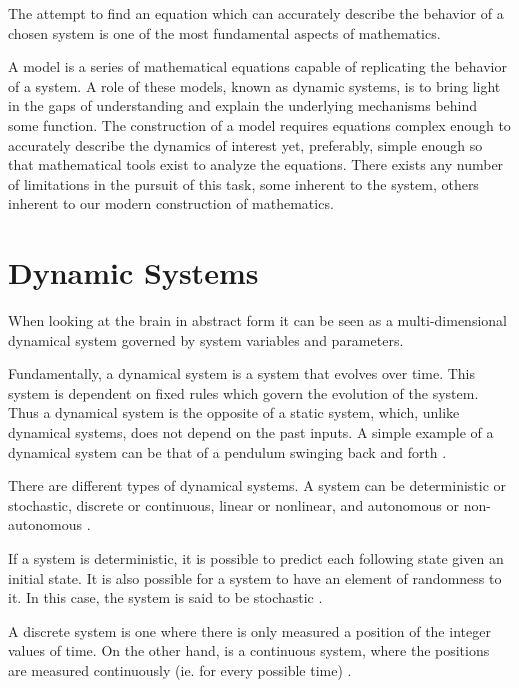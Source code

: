 \documentclass[../../Orator.tex]{subfiles}
\begin{document}
The attempt to find an equation which can accurately describe the behavior of a chosen system is one of the most fundamental aspects of mathematics.

A model is a series of mathematical equations capable of replicating the behavior of a system. A role of these models, known as dynamic systems, is to bring light in the gaps of understanding and explain the underlying mechanisms behind some function. 
The construction of a model requires equations complex enough to accurately describe the dynamics of interest yet, preferably, simple enough so that mathematical tools exist to analyze the equations\footnotemark. 
There exists any number of limitations in the pursuit of this task, some inherent to the system, others inherent to our modern construction of mathematics.

\section{Dynamic Systems}

When looking at the brain in abstract form it can be seen as a multi-dimensional dynamical system governed by system variables and parameters.

Fundamentally, a dynamical system is a system that evolves over time. This system is dependent on fixed rules which govern the evolution of the system. Thus a dynamical system is the opposite of a static system, which, unlike dynamical systems, does not depend on the past inputs. A simple example of a dynamical system can be that of a pendulum swinging back and forth \cite{}. 

There are different types of dynamical systems. A system can be deterministic or stochastic, discrete or continuous, linear or nonlinear, and autonomous or non-autonomous \cite{}. 

If a system is deterministic, it is possible to predict each following state given an initial state. It is also possible for a system to have an element of randomness to it. In this case, the system is said to be stochastic \cite{}. 

A discrete system is one where there is only measured a position of the integer values of time. On the other hand, is a continuous system, where the positions are measured continuously (ie. for every possible time) \cite{}.
\end{document}
